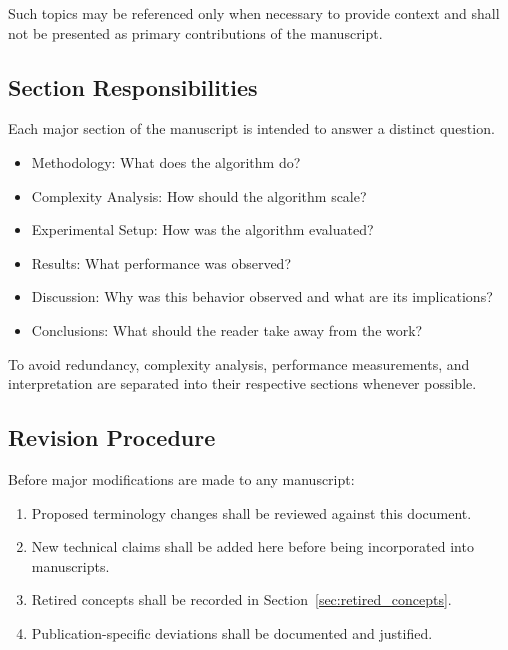 Such topics may be referenced only when necessary to provide context and
shall not be presented as primary contributions of the manuscript.

\subsection{Section Responsibilities}

Each major section of the manuscript is intended to answer a distinct
question.

\begin{itemize}
\item Methodology: What does the algorithm do?
\item Complexity Analysis: How should the algorithm scale?
\item Experimental Setup: How was the algorithm evaluated?
\item Results: What performance was observed?
\item Discussion: Why was this behavior observed and what are its implications?
\item Conclusions: What should the reader take away from the work?
\end{itemize}

To avoid redundancy, complexity analysis, performance measurements, and
interpretation are separated into their respective sections whenever
possible.

\subsection{Revision Procedure}

Before major modifications are made to any manuscript:

\begin{enumerate}
\item Proposed terminology changes shall be reviewed against this document.
\item New technical claims shall be added here before being incorporated into manuscripts.
\item Retired concepts shall be recorded in Section~\ref{sec:retired_concepts}.
\item Publication-specific deviations shall be documented and justified.
\end{enumerate}

